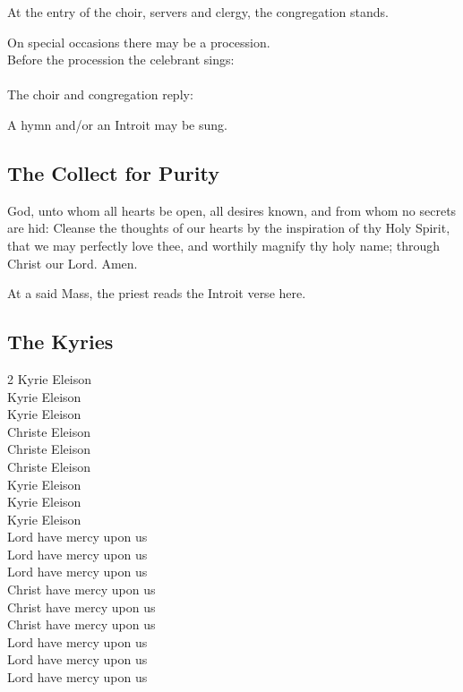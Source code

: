 
\begin{rubric}
At the entry of the choir, servers and clergy, the congregation stands.
\end{rubric}

\begin{rubric}
On special occasions there may be a procession.\\
Before the procession the celebrant sings:\\
\\
The choir and congregation reply:\\
\end{rubric}

\begin{rubric}
A hymn and/or an Introit may be sung.
\end{rubric}

\subsection{The Collect for Purity}

 God, unto whom all hearts be open, all desires known, and from whom no secrets are hid:
Cleanse the thoughts of our hearts by the inspiration of thy Holy Spirit, that we may perfectly love thee,
and worthily magnify thy holy name; through Christ our Lord. Amen.

\begin{rubric}
At a said Mass, the priest reads the Introit verse here.
\end{rubric}

\subsection{The Kyries}

\begin{multicols}{2}
Kyrie Eleison\\
Kyrie Eleison\\
Kyrie Eleison\\
Christe Eleison\\
Christe Eleison\\
Christe Eleison\\
Kyrie Eleison\\
Kyrie Eleison\\
Kyrie Eleison\\
Lord have mercy upon us\\
Lord have mercy upon us\\
Lord have mercy upon us\\
Christ have mercy upon us\\
Christ have mercy upon us\\
Christ have mercy upon us\\
Lord have mercy upon us\\
Lord have mercy upon us\\
Lord have mercy upon us
\end{multicols}

